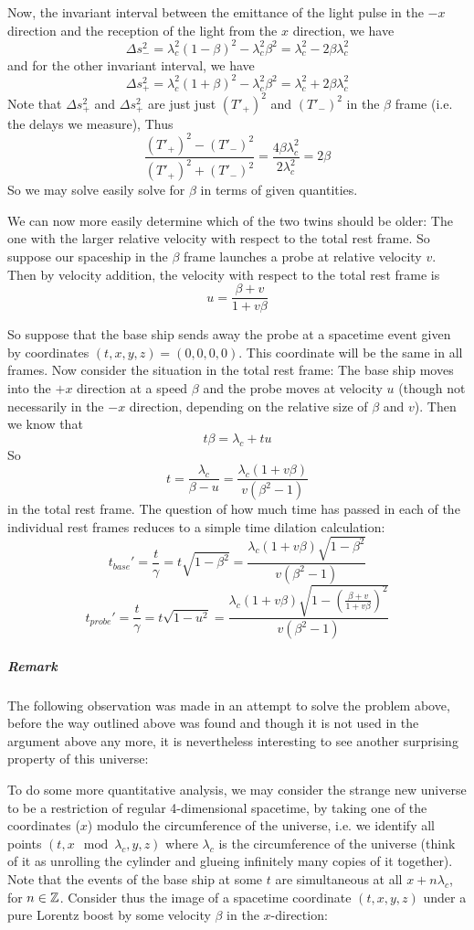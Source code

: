 Now, the invariant interval between the emittance of the light pulse in the $-x$ direction and the reception of the light from the $x$ direction, we have
\[ \Delta s_-^2 = \lambda_c^2(1-\beta)^2 - \lambda_c^2\beta^2 = \lambda_c^2 - 2\beta\lambda_c^2 \]
and for the other invariant interval, we have 
\[ \Delta s_+^2 = \lambda_c^2(1+\beta)^2 - \lambda_c^2\beta^2 = \lambda_c^2 + 2\beta\lambda_c^2 \]
Note that $\Delta s_+^2$ and $\Delta s_+^2$ are just just $(T'_+)^2$ and $(T'_-)^2$ in the $\beta$ frame (i.e. the delays we measure), Thus
\[ \frac{(T'_+)^2 - (T'_-)^2}{(T'_+)^2 + (T'_-)^2} = \frac{4\beta\lambda_c^2}{2\lambda_c^2} = 2\beta \]
So we may solve easily solve for $\beta$ in terms of given quantities. \par 
We can now more easily determine which of the two twins should be older: The one with the larger relative velocity with respect to the total rest frame.
So suppose our spaceship in the $\beta$ frame launches a probe at relative velocity $v$. Then by velocity addition, the velocity with respect to the total rest frame is
\[ u=\frac{\beta+v}{1+v\beta} \]
 \par 
 So suppose that the base ship sends away the probe at a spacetime event given by coordinates
 $(t,x,y,z) = (0,0,0,0)$. This coordinate will be the same in all frames. Now consider the situation in the total rest frame: The base ship moves into the $+x$ direction at a speed $\beta$ and the probe moves at velocity $u$ (though not necessarily in the $-x$ direction, depending on the relative size of $\beta$ and $v$). Then we know that
 \[ t\beta = \lambda_c + tu \]
 So 
 \[ t = \frac{\lambda_c}{\beta - u} = \frac{\lambda_c (1+v\beta)}{v(\beta^2-1)}\]
 in the total rest frame. The question of how much time has passed in each of the individual rest frames reduces to a simple time dilation calculation:
 \[ t_{base}' = \frac{t}{\gamma} = t\sqrt{1-\beta^2} = \frac{\lambda_c (1+v\beta) \sqrt{1-\beta^2}}{v(\beta^2-1)} \]
\[ t_{probe}' = \frac{t}{\gamma} = t\sqrt{1-u^2}
= \frac{\lambda_c (1+v\beta) \sqrt{1-\left(\frac{\beta+v}{1+v\beta}\right)^2}}{v(\beta^2-1)} \]
\subparagraph{Remark}
The following observation was made in an attempt to solve the problem above, before the way outlined above was found and though it is not used in the argument above any more, it is nevertheless interesting to see another surprising property of this universe:\par
To do some more quantitative analysis, we may consider the strange new universe to be a restriction of regular 4-dimensional spacetime,  by taking one of the coordinates ($x$) modulo the circumference of the universe, i.e. we identify all points $(t,x \mod \lambda_c ,y,z)$ where $\lambda_c$ is the circumference of the universe (think of it as unrolling the cylinder and glueing infinitely many copies of it together). Note that the events of the base ship at some $t$ are simultaneous at all $x+n\lambda_c$, for $n\in \mathbb{Z}$. Consider thus the image of a spacetime coordinate $(t, x, y, z)$ under a pure Lorentz boost by some velocity $\beta$ in the $x$-direction:
